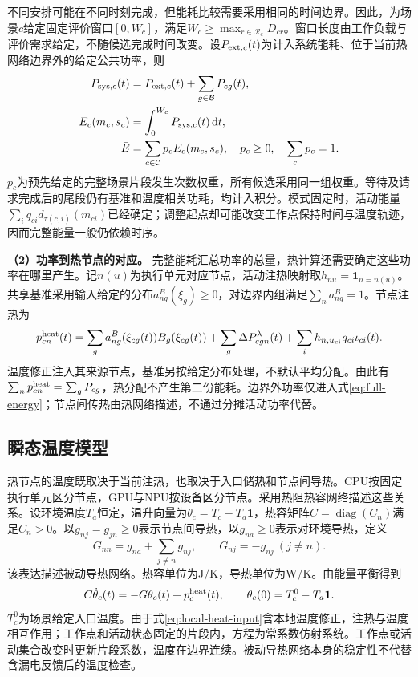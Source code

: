 不同安排可能在不同时刻完成，但能耗比较需要采用相同的时间边界。因此，为场景\(c\)给定固定评价窗口\([0,W_c]\)，满足\(W_c\ge\max_{r\in\mathcal R_c}D_{cr}\)。窗口长度由工作负载与评价需求给定，不随候选完成时间改变。设\(P_{{\rm ext},c}(t)\)为计入系统能耗、位于当前热网络边界外的给定公共功率，则
\begin{equation}
\begin{aligned}
P_{{\rm sys},c}(t)&=P_{{\rm ext},c}(t)+\sum_{g\in\mathcal B}P_{cg}(t),\\
E_c(m_c,s_c)&=\int_0^{W_c}P_{{\rm sys},c}(t)\,\mathrm dt,\\
\bar E&=\sum_{c\in\mathcal C}p_cE_c(m_c,s_c),\quad
p_c\ge0,\quad\sum_cp_c=1.
\end{aligned}
\label{eq:full-energy}
\end{equation}
\(p_c\)为预先给定的完整场景片段发生次数权重，所有候选采用同一组权重。等待及请求完成后的尾段仍有基准和温度相关功耗，均计入积分。模式固定时，活动能量\(\sum_iq_{ci}d_{\tau(c,i)}(m_{ci})\)已经确定；调整起点却可能改变工作点保持时间与温度轨迹，因而完整能量一般仍依赖时序。

\textbf{（2）功率到热节点的对应。}
完整能耗汇总功率的总量，热计算还需要确定这些功率在哪里产生。记\(n(u)\)为执行单元对应节点，活动注热映射取\(h_{nu}=\mathbf1_{n=n(u)}\)。共享基准采用输入给定的分布\(a^B_{ng}(\xi_g)\ge0\)，对边界内组满足\(\sum_na^B_{ng}=1\)。节点注热为
\begin{equation}
p^{\rm heat}_{cn}(t)=
\sum_g a^B_{ng}(\xi_{cg}(t))B_g(\xi_{cg}(t))
+\sum_g\Delta P^\lambda_{cgn}(t)
+\sum_i h_{n,u_{ci}}q_{ci}\iota_{ci}(t).
\label{eq:local-heat-input}
\end{equation}
温度修正注入其来源节点，基准另按给定分布处理，不默认平均分配。由此有\(\sum_np^{\rm heat}_{cn}=\sum_gP_{cg}\)，热分配不产生第二份能耗。边界外功率仅进入式\eqref{eq:full-energy}；节点间传热由热网络描述，不通过分摊活动功率代替。

\subsection{瞬态温度模型}

热节点的温度既取决于当前注热，也取决于入口储热和节点间导热。CPU按固定执行单元区分节点，GPU与NPU按设备区分节点。采用热阻热容网络描述这些关系\cite{chantem2011,fdtm2022}。设环境温度\(T_a\)恒定，温升向量为\(\theta_c=T_c-T_a\mathbf1\)，热容矩阵\(C=\operatorname{diag}(C_n)\)满足\(C_n>0\)。以\(g_{nj}=g_{jn}\ge0\)表示节点间导热，以\(g_{na}\ge0\)表示对环境导热，定义
\begin{equation}
G_{nn}=g_{na}+\sum_{j\ne n}g_{nj},\qquad
G_{nj}=-g_{nj}\ (j\ne n).
\label{eq:conductance-matrix}
\end{equation}
该表达描述被动导热网络。热容单位为J/K，导热单位为W/K。由能量平衡得到
\begin{equation}
C\dot\theta_c(t)=-G\theta_c(t)+p^{\rm heat}_c(t),\qquad
\theta_c(0)=T_c^0-T_a\mathbf1.
\label{eq:thermal-ode}
\end{equation}
\(T_c^0\)为场景给定入口温度。由于式\eqref{eq:local-heat-input}含本地温度修正，注热与温度相互作用；工作点和活动状态固定的片段内，方程为常系数仿射系统。工作点或活动集合改变时更新片段系数，温度在边界连续。被动导热网络本身的稳定性不代替含漏电反馈后的温度检查。

